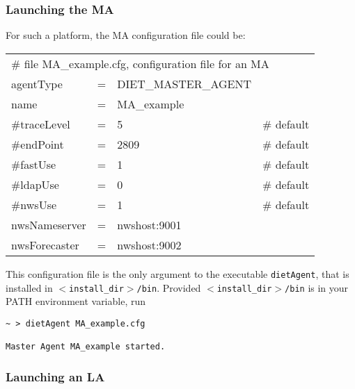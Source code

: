 \subsubsection{Launching the MA}

For such a platform, the MA configuration file could be:
\tt
\begin{center}
 \footnotesize
 \begin{tabular}{lcll}
  \multicolumn{4}{l}{\# file MA\_example.cfg, configuration file for an MA}\\
  agentType    &=&DIET\_MASTER\_AGENT&\\
  name         &=&MA\_example        &\\
  \#traceLevel &=&5                  &\# default\\
  \#endPoint   &=&2809               &\# default\\
  \#fastUse    &=&1                  &\# default\\
  \#ldapUse    &=&0                  &\# default\\
  \#nwsUse     &=&1                  &\# default\\
  nwsNameserver&=&nwshost:9001       &\\
  nwsForecaster&=&nwshost:9002       &\\
 \end{tabular}
\end{center}
\rm

This configuration file is the only argument to the executable \texttt{dietAgent},
that is installed in \texttt{$<$install\_dir$>$/bin}. Provided
\texttt{$<$install\_dir$>$/bin} is in your PATH environment variable, run
{\footnotesize
\begin{verbatim}
~ > dietAgent MA_example.cfg

Master Agent MA_example started.
\end{verbatim}
}


\subsubsection{Launching an LA}

